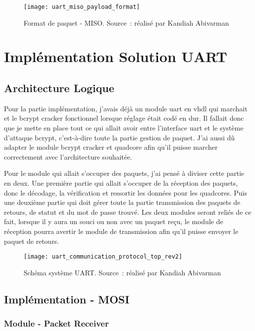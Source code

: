 \begin{figure}[tbph!]
	\centering
	\texttt{[image: uart\_miso\_payload\_format]}
	\caption[Format de paquet - MISO]{Format de paquet - MISO. Source : réalisé par Kandiah Abivarman}
	\label{fig:uart_miso_payload_format}
\end{figure}

\newpage

\section{Implémentation Solution UART}

\subsection{Architecture Logique}

Pour la partie implémentation, j’avais déjà un module \gls{uart} en \gls{vhdl} qui marchait et le bcrypt cracker fonctionnel lorsque réglage était codé en dur. 
Il fallait donc que je mette en place tout ce qui allait avoir entre l’interface \gls{uart} et le système d’attaque bcrypt, c’est-à-dire toute la partie gestion de paquet. 
J’ai aussi dû adapter le module bcrypt cracker et quadcore afin qu’il puisse marcher correctement avec l’architecture souhaitée.

Pour le module qui allait s’occuper des paquets, j’ai pensé à diviser cette partie en deux. 
Une première partie qui allait s’occuper de la réception des paquets, donc le décodage, la vérification et ressortir les données pour les quadcores. 
Puis une deuxième partie qui doit gérer toute la partie transmission des paquets de retours, de statut et du mot de passe trouvé. 
Les deux modules seront reliés de ce fait, lorsque il y aura un souci ou non avec un paquet reçu, le module de réception pourra avertir le module de transmission afin qu’il puisse envoyer le paquet de retours.

\begin{figure}[tbph!]
	\centering
	\texttt{[image: uart\_communication\_protocol\_top\_rev2]}
	\caption[Schéma système UART - FPGA]{Schéma système UART. Source : réalisé par Kandiah Abivarman}
	\label{fig:uart_top_schematics}
\end{figure}


\subsection{Implémentation - MOSI}
\subsubsection{Module - Packet Receiver}
